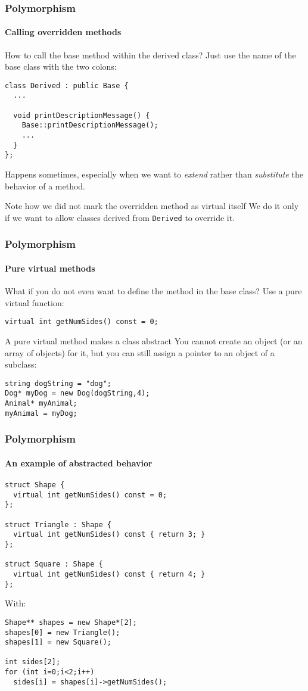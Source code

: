 \begin{frame}[fragile]
\frametitle{Polymorphism}
\framesubtitle{Calling overridden methods}

\begin{block}{How to call the base method within the derived class?}
Just use the name of the base class with the two colons:
{\scriptsize 
\begin{verbatim}
class Derived : public Base {
  ...
  
  void printDescriptionMessage() {
    Base::printDescriptionMessage();
    ...
  }
};
\end{verbatim}
}
Happens sometimes, especially when we want to {\em extend} rather than {\em substitute} the behavior of a method.
\end{block}
\pause
\begin{block}{Note how we did not mark the overridden method as virtual itself}
We do it only if we want to allow classes derived from \texttt{Derived} to override it.
\end{block}

\end{frame}

\begin{frame}[fragile]
\frametitle{Polymorphism}
\framesubtitle{Pure virtual methods}

\begin{block}{What if you do not even want to define the method in the base class?}
Use a pure virtual function:

{\scriptsize 
\texttt{virtual int getNumSides() const = 0; }
}
\end{block}
\pause
\begin{block}{A pure virtual method makes a class abstract}
You cannot create an object (or an array of objects) for it, but you can still assign a pointer to an object of a subclass:

{\scriptsize 
\begin{verbatim}
string dogString = "dog";
Dog* myDog = new Dog(dogString,4);
Animal* myAnimal;
myAnimal = myDog;
\end{verbatim}
}

\end{block}

\end{frame}

\begin{frame}[fragile]
\frametitle{Polymorphism}
\framesubtitle{An example of abstracted behavior}
{\scriptsize 
\begin{verbatim}
struct Shape {
  virtual int getNumSides() const = 0;
};

struct Triangle : Shape {
  virtual int getNumSides() const { return 3; }
};

struct Square : Shape {
  virtual int getNumSides() const { return 4; }
};
\end{verbatim}
}
With:
{\scriptsize 
\begin{verbatim}
Shape** shapes = new Shape*[2];
shapes[0] = new Triangle();
shapes[1] = new Square();
  
int sides[2];
for (int i=0;i<2;i++)
  sides[i] = shapes[i]->getNumSides();
\end{verbatim}
}
\end{frame}

